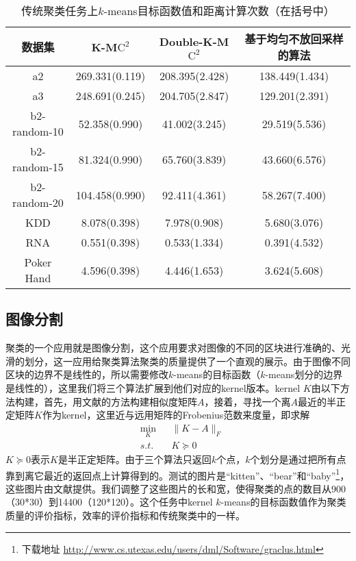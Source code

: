 \begin{table}[h]
	\caption{传统聚类任务上$k$-means目标函数值和距离计算次数（在括号中）}
	\label{tab:results on synthetic data}
	\begin{tabular}{cccc}
		\toprule
		数据集 & K-M$\text{C}^2$ & Double-K-M$\text{C}^2$ & 基于均匀不放回采样的算法 \\
		\midrule
		a2 & 269.331(0.119) & 208.395(2.428) & 138.449(1.434) \\
		a3 & 248.691(0.245) & 204.705(2.847) & 129.201(2.391) \\
		b2-random-10 & 52.358(0.990) & 41.002(3.245) & 29.519(5.536) \\
		b2-random-15 & 81.324(0.990) & 65.760(3.839) & 43.660(6.576) \\
		b2-random-20 & 104.458(0.990) & 92.411(4.361) & 58.267(7.400) \\
		\midrule %
		KDD & 8.078(0.398) & 7.978(0.908) & 5.680(3.076) \\
		RNA & 0.551(0.398) & 0.533(1.334) & 0.391(4.532) \\
		Poker Hand & 4.596(0.398) & 4.446(1.653) & 3.624(5.608) \\			
		\bottomrule
	\end{tabular}
\end{table}

\subsection{图像分割}
聚类的一个应用就是图像分割，这个应用要求对图像的不同的区块进行准确的、光滑的划分，这一应用给聚类算法聚类的质量提供了一个直观的展示。由于图像不同区块的边界不是线性的，所以需要修改$k$-means的目标函数（$k$-means划分的边界是线性的），这里我们将三个算法扩展到他们对应的kernel版本。kernel $K$由以下方法构建，首先，用文献\cite{stella2003multiclass}的方法构建相似度矩阵$A$，接着，寻找一个离$A$最近的半正定矩阵$K$作为kernel，这里近与远用矩阵的Frobenius范数来度量，即求解
\begin{equation}
	\begin{aligned}
		& \underset{K}{\text{min}} 
		& & \lVert K - A \rVert_F \\
		& s.t. 
		& & K \succeq 0
	\end{aligned}
\end{equation}
$K \succeq 0$表示$K$是半正定矩阵。由于三个算法只返回$k$个点，$k$个划分是通过把所有点靠到离它最近的返回点上计算得到的。测试的图片是“kitten”、“bear”和“baby”\footnote{下载地址 \url{http://www.cs.utexas.edu/users/dml/Software/graclus.html}}，这些图片由文献\cite{dhillon2004kernel}提供。我们调整了这些图片的长和宽，使得聚类的点的数目从900（30*30）到14400（120*120）。这个任务中kernel $k$-means的目标函数值作为聚类质量的评价指标，效率的评价指标和传统聚类中的一样。

